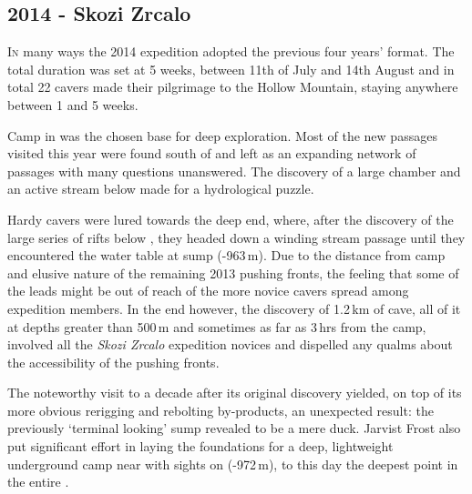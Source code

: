 \newpage
\begin{tcolorbox}

\chapter{2014 - Skozi Zrcalo}
		\lettrine{I}{n} many ways the 2014 expedition adopted the previous four years' format. The total duration was set at 5 weeks, between 11th of July and 14th August and in total 22 cavers made their pilgrimage to the Hollow Mountain, staying anywhere between 1 and 5 weeks.

Camp  in  was the chosen base for deep exploration. Most of the new passages visited this year were found south of  and left as an expanding network of passages with many questions unanswered. The discovery of a large chamber and an active stream below made for a hydrological puzzle.

		Hardy cavers were lured towards the deep end, where, after the discovery of the large series of rifts below , they headed down a winding stream passage until they encountered the water table at  sump (-963\,m).  Due to the distance from camp and elusive nature of the remaining 2013 pushing fronts, the feeling that some of the leads might be out of reach of the more novice cavers spread among expedition members. In the end however, the discovery of 1.2\,km of cave, all of it at depths greater than 500\,m and sometimes as far as 3\,hrs from the camp, involved all the \emph{Skozi Zrcalo} expedition novices and dispelled any qualms about the accessibility of the pushing fronts.

 		The noteworthy visit to  a decade after its original discovery yielded, on top of its more obvious rerigging and rebolting by-products, an unexpected result: the previously `terminal looking' sump revealed to be a mere duck. Jarvist Frost also put significant effort in laying the foundations for a deep, lightweight underground camp near  with sights on  (-972\,m), to this day the deepest point in the entire .
		
\end{tcolorbox}
